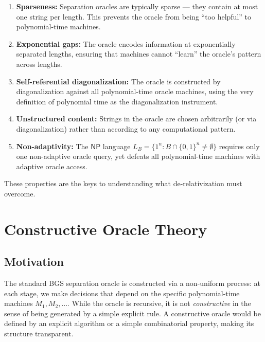 \documentclass[11pt,a4paper]{article}
\theoremstyle{plain}
\theoremstyle{definition}
\theoremstyle{remark}
\newcommand{\NP}{\mathsf{NP}}
\newcommand{\bits}{\{0,1\}}
\begin{document}
\begin{enumerate}[label=\textbf{P\arabic*}.]
    \item \textbf{Sparseness:} Separation oracles are typically sparse — they
    contain at most one string per length.  This prevents the oracle from being
    ``too helpful'' to polynomial-time machines.

    \item \textbf{Exponential gaps:} The oracle encodes information at
    exponentially separated lengths, ensuring that machines cannot ``learn'' the
    oracle's pattern across lengths.

    \item \textbf{Self-referential diagonalization:} The oracle is constructed
    by diagonalization against all polynomial-time oracle machines, using the
    very definition of polynomial time as the diagonalization instrument.

    \item \textbf{Unstructured content:} Strings in the oracle are chosen
    arbitrarily (or via diagonalization) rather than according to any
    computational pattern.

    \item \textbf{Non-adaptivity:} The $\NP$ language $L_B = \{1^n : B \cap
    \bits^n \neq \emptyset\}$ requires only one non-adaptive oracle query,
    yet defeats all polynomial-time machines with adaptive oracle access.
\end{enumerate}

These properties are the keys to understanding what de-relativization must
overcome.

\section{Constructive Oracle Theory}\label{sec:constructive}

\subsection{Motivation}

The standard BGS separation oracle is constructed via a non-uniform process: at
each stage, we make decisions that depend on the specific polynomial-time
machines $M_1, M_2, \ldots$.  While the oracle is recursive, it is not
\emph{constructive} in the sense of being generated by a simple explicit rule.
A constructive oracle would be defined by an explicit algorithm or a simple
combinatorial property, making its structure transparent.
\end{document}
